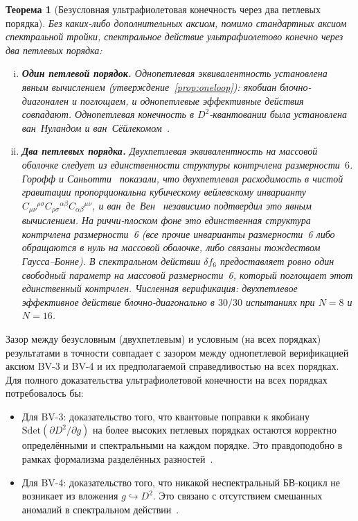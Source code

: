 \documentclass[12pt,a4paper]{article}
\newtheorem{theorem}{Теорема}[section]
\theoremstyle{definition}
\theoremstyle{remark}
\begin{document}
\begin{theorem}[Безусловная ультрафиолетовая конечность через два петлевых порядка]
\label{thm:unconditional_two_loop}
Без каких-либо дополнительных аксиом, помимо стандартных аксиом
спектральной тройки, спектральное действие ультрафиолетово конечно
через два петлевых порядка:
\begin{enumerate}[(i)]
  \item \textbf{Один петлевой порядок.}  Однопетлевая эквивалентность
    установлена явным вычислением (утверждение~\ref{prop:oneloop}):
    якобиан блочно-диагонален и поглощаем, и однопетлевые эффективные
    действия совпадают.  Однопетлевая конечность в $D^2$-квантовании
    была установлена ван~Нуландом и
    ван~Сёйлекомом~\cite{vanNuland:2021oneloop}.
  \item \textbf{Два петлевых порядка.}  Двухпетлевая эквивалентность
    на массовой оболочке следует из единственности структуры
    контрчлена размерности~$6$.
    Горофф и Саньотти~\cite{Goroff:1985th} показали, что двухпетлевая
    расходимость в чистой гравитации пропорциональна кубическому
    вейлевскому инварианту
    $C_{\mu\nu}{}^{\rho\sigma}C_{\rho\sigma}{}^{\alpha\beta}
    C_{\alpha\beta}{}^{\mu\nu}$, и ван~де~Вен~\cite{vandeVen:1992gw}
    независимо подтвердил это явным вычислением.  На риччи-плоском
    фоне это \emph{единственная} структура контрчлена размерности~6
    (все прочие инварианты размерности~6 либо обращаются в нуль на
    массовой оболочке, либо связаны тождеством Гаусса--Бонне).  В
    спектральном действии $\delta f_6$ предоставляет ровно один
    свободный параметр на массовой размерности~6, который поглощает
    этот единственный контрчлен.  Численная верификация: двухпетлевое
    эффективное действие блочно-диагонально в $30/30$ испытаниях при
    $N = 8$ и $N = 16$.
\end{enumerate}
\end{theorem}

\noindent
Зазор между безусловным (двухпетлевым) и условным (на всех порядках)
результатами в точности совпадает с зазором между однопетлевой
верификацией аксиом BV-3 и BV-4 и их предполагаемой справедливостью
на всех порядках.  Для полного доказательства ультрафиолетовой
конечности на всех порядках потребовалось бы:
\begin{itemize}
  \item Для BV-3: доказательство того, что квантовые поправки к
    якобиану $\mathrm{Sdet}(\partial D^2 / \partial g)$ на более
    высоких петлевых порядках остаются корректно определёнными и
    спектральными на каждом порядке.  Это правдоподобно в рамках
    формализма разделённых разностей~\cite{vanNuland:2021oneloop,
    Hekkelman:2025power}.
  \item Для BV-4: доказательство того, что никакой неспектральный
    БВ-коцикл не возникает из вложения $g \hookrightarrow D^2$.  Это
    связано с отсутствием смешанных аномалий в спектральном
    действии~\cite{Connes:2008vs}.
\end{itemize}
\end{document}
